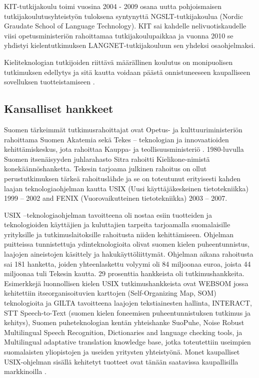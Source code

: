 \documentclass[]{../../metanetpaper}
\begin{document}
\begin{multicols}{2}
KIT-tutkijakoulu toimi vuosina 2004 - 2009 osana uutta pohjoismaisen
tutkijakoulutusyhteistyön tuloksena syntynyttä NGSLT-tutkijakoulua
(Nordic Graudate School of Language Technology). KIT sai kahdelle
nelivuotiskaudelle viisi opetusministeriön rahoittamaa
tutkijakoulupaikkaa ja vuonna 2010 se yhdistyi kielentutkimuksen
LANGNET-tutkijakouluun sen yhdeksi osaohjelmaksi.

Kieliteknologian tutkijoiden riittävä määrällinen koulutus on
monipuolisen tutkimuksen edellytys ja sitä kautta voidaan päästä
onnistuneeseen kaupalliseen sovelluksen
tuotteistamiseen \cite{FinExp}.


\subsection{Kansalliset hankkeet}


Suomen tärkeimmät tutkimusrahoittajat ovat Opetus- ja
kulttuuriministeriön rahoittama Suomen Akatemia sekä Tekes –
teknologian ja innovaatioiden kehittämiskeskus, jota rahoittaa Kauppa-
ja teollisuusministeriö \cite{Leading}. 1980-luvulla Suomen
itsenäisyyden juhlarahasto Sitra rahoitti Kielikone-nimistä
konekäännöshanketta. Tekesin tarjoama julkinen rahoitus on ollut
perustutkimuksen tärkeä rahoituslähde ja se on toteutunut erityisesti
kahden laajan teknologiaohjelman kautta USIX (Uusi käyttäjäkeskeinen
tietotekniikka) 1999 – 2002 and FENIX (Vuorovaikutteinen
tietotekniikka) 2003 – 2007.

USIX –teknologiaohjelman tavoitteena oli nostaa esiin tuotteiden ja
teknologioiden käyttäjien ja kuluttajien tarpeita tarjoamalla
suomalaisille yrityksille ja tutkimuslaitoksille rahoitusta niiden
kehittämiseen. Ohjelman puitteissa tunnistettuja ydinteknologioita
olivat suomen kielen puheentunnistus, laajojen aineistojen käsittely
ja hakukäyttöliittymät. Ohjelman aikana rahoitusta sai 181 hanketta,
joiden yhteenlaskettu volyymi oli 84 miljoonaa euroa, joista 44
miljoonaa tuli Tekesin kautta. 29 prosenttia hankkeista oli
tutkimushankkeita. Esimerkkejä luonnollisen kielen USIX
tutkimushankkeista ovat WEBSOM jossa kehitettiin itseorganisoituvien
karttojen (Self-Organizing Map, SOM) teknologioita ja GILTA
tavoitteena laajojen tekstiainesten hallinta, INTERACT, STT
Speech-to-Text (suomen kielen foneemisen puheentunnistuksen tutkimus
ja kehitys), Suomen puheteknologian kentän yhteishanke SuoPuhe, Noise
Robust Multilingual Speech Recognition, Dictionaries and language
checking tools, ja Multilingual adaptative translation knowledge base,
jotka toteutettiin useimpien suomalaisten yliopistojen ja useiden
yritysten yhteistyönä. Monet kaupalliset USIX-ohjelman sisällä
kehitetyt tuotteet ovat tänään saatavissa kaupallisilla
markkinoilla \cite{LoppuUSIX}.


\end{multicols}
\end{document}
